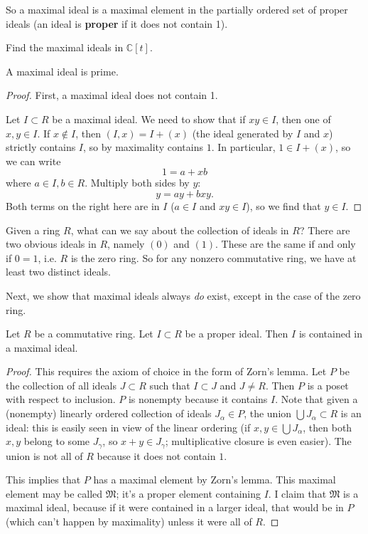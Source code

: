 So a maximal ideal is a maximal element in the partially ordered set of proper
ideals (an ideal is \textbf{proper} if it does not contain 1).

\begin{exercise} 
Find the maximal ideals in $\mathbb{C}[t]$.
\end{exercise} 


\begin{proposition} 
A maximal ideal is prime.
\end{proposition} 
\begin{proof} 
First, a maximal ideal does not contain 1.

Let $I \subset R$ be a maximal ideal.
We need to show that if $xy \in I$,
then one of $x,y \in I$.  If $x \notin I$, then $(I,x) = I + (x)$ (the ideal
generated by $I$ and $x$) strictly contains $I$, so by maximality contains
$1$.  In particular, $1 \in I+(x)$, so we can write
\[ 1 = a + xb  \]
where $a \in I, b \in R$. Multiply both sides by $y$:
\[ y = ay  + bxy.  \]
Both terms on the right here are in $I$ ($a \in I$ and $xy \in I$), so we find
that $y \in I$.

\end{proof} 

Given a ring $R$, what can we say about the collection of ideals in $R$?
There
are two obvious ideals in $R$, namely $(0)$ and $ (1)$.  These are the same if and
only if $0=1$, i.e. $R$ is the zero ring.
So for any nonzero commutative ring, we have at least two distinct ideals.  

Next, we show that maximal ideals always \emph{do} exist, except in the case
of the zero ring. 
\begin{proposition} \label{anycontainedinmaximal}
Let $R$ be a commutative ring. Let $I \subset R$ be a proper ideal.  Then $I$
is contained in a maximal ideal.
\end{proposition} 

\begin{proof} 
This requires the axiom of choice in the form of Zorn's lemma.  Let
$P$ be the collection of all ideals $J \subset R$ such that $I
\subset J$ and $J \neq R$.  Then $P$ is a poset with respect to  inclusion.  $P$ is
nonempty because it contains $I$.  Note that given a (nonempty) linearly ordered
collection of ideals $J_{\alpha} \in P$, the union $\bigcup J_{\alpha} \subset
R$ is an ideal: this is easily seen in view of the linear ordering (if $x,y
\in \bigcup J_{\alpha}$, then both $x,y$ belong to some $J_{\gamma}$, so $x+y
\in J_{\gamma}$; multiplicative closure is even easier). The union is not all
of $R$ because it does not contain $1$.  

This implies that $P$ has a maximal element by Zorn's lemma.  This maximal element may
be called $\mathfrak{M}$; it's a proper element containing $I$. I claim that
$\mathfrak{M}$ is a maximal ideal, because if it were contained in a larger
 ideal, that would  be in $P$ (which can't happen by maximality) unless it were all of $R$.
\end{proof} 

